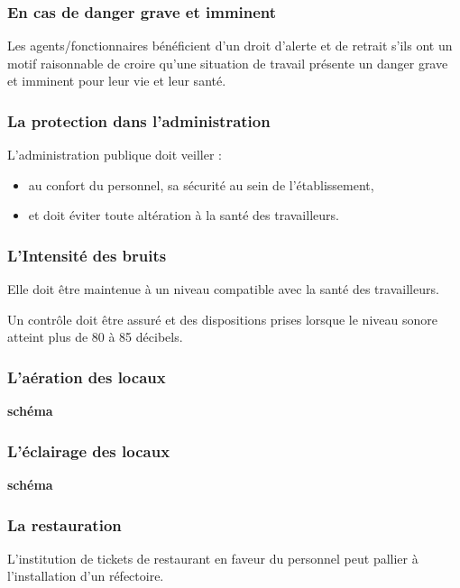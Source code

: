 \documentclass{beamer}
\begin{document}
\begin{frame}
\frametitle{En cas de danger grave et imminent}

Les agents/fonctionnaires bénéficient d’un droit d’alerte et de retrait s’ils ont un motif raisonnable de croire qu’une situation de travail présente un danger grave et imminent pour leur vie et leur santé.

\end{frame}

\begin{frame}
\frametitle{La protection dans l’administration}

L’administration publique doit veiller :
\begin{itemize}
        \item au confort du personnel,
         sa sécurité au sein de l’établissement,
        \item et doit éviter toute altération à la santé des travailleurs.
\end{itemize}
\end{frame}

\begin{frame}
\frametitle{L’Intensité des bruits}

Elle doit être maintenue à un niveau compatible avec la santé des travailleurs.

Un contrôle doit être assuré et des dispositions prises lorsque le niveau sonore atteint plus de 80 à 85 décibels.

\end{frame}

\begin{frame}
\frametitle{L’aération des locaux}

\textbf{schéma}
\end{frame}

\begin{frame}
\frametitle{L’éclairage des locaux}

\textbf{schéma}
\end{frame}

\begin{frame}
\frametitle{La restauration}

L’institution de tickets de restaurant en faveur du personnel peut pallier à l’installation d’un réfectoire.

\end{frame}
\end{document}
